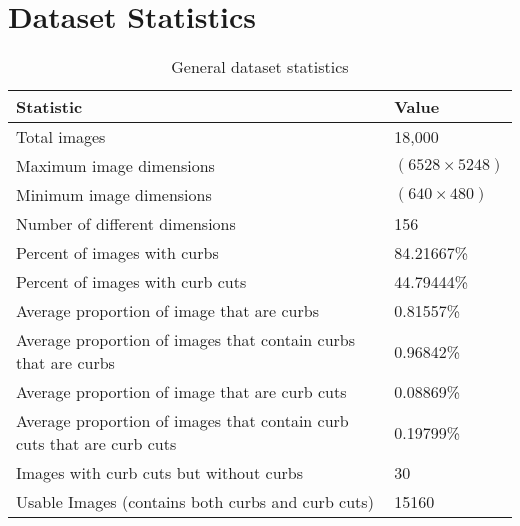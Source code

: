 \section{Dataset Statistics}\label{appendix:dataset}

\begin{table}[h!]
	\centering
	\begin{tabular}{@{}p{}l@{}}
		\toprule
		Statistic & Value\\ \midrule
		Total images & 18,000 \\
		Maximum image dimensions & $\left(6528 \times 5248\right)$ \\
		Minimum image dimensions & $\left(640 \times 480\right)$ \\
		Number of different dimensions & 156 \\
		Percent of images with curbs & 84.21667\% \\
		Percent of images with curb cuts & 44.79444\% \\
		Average proportion of image that are curbs & 0.81557\% \\
		Average proportion of images that contain curbs that are curbs & 0.96842\% \\
		Average proportion of image that are curb cuts & 0.08869\% \\
		Average proportion of images that contain curb cuts that are curb cuts & 0.19799\% \\
		Images with curb cuts but without curbs & 30 \\ 
		Usable Images (contains both curbs and curb cuts) & 15160 \\\bottomrule
	\end{tabular}
	\caption{General dataset statistics}
	\label{tab:appendix-dataset}
\end{table}

